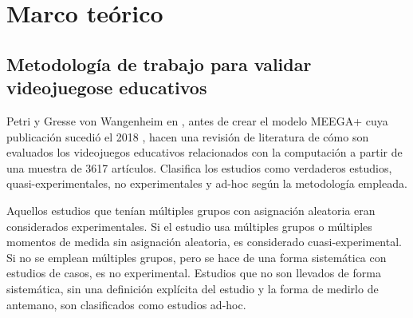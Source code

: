 \section{Marco teórico}

\subsection{Metodología de trabajo para validar videojuegose educativos}

Petri y Gresse von Wangenheim en \cite{HowGamesComputingEducationEvaluated}, antes de crear el modelo MEEGA+ cuya publicación sucedió el 2018 \cite{meegaplus}, hacen una revisión de literatura de cómo son evaluados los videojuegos educativos relacionados con la computación a partir de una muestra de 3617 artículos. Clasifica los estudios como verdaderos estudios, quasi-experimentales, no experimentales y ad-hoc según la metodología empleada.


Aquellos estudios que tenían múltiples grupos con asignación aleatoria eran considerados experimentales. Si el estudio usa múltiples grupos o múltiples momentos de medida sin asignación aleatoria, es considerado cuasi-experimental. Si no se emplean múltiples grupos, pero se hace de una forma sistemática con estudios de casos, es no experimental. Estudios que no son llevados de forma sistemática, sin una definición explícita del estudio y la forma de medirlo de antemano, son clasificados como estudios ad-hoc.

